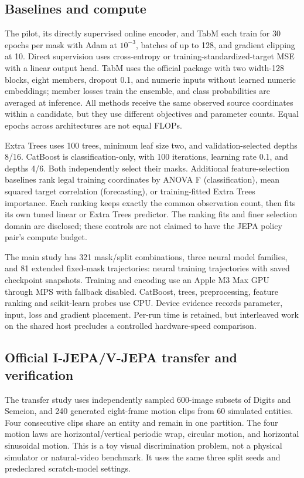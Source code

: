 \documentclass{article}
\begin{document}
\subsection{Baselines and compute}
The pilot, its directly supervised online encoder, and TabM each train for 30 epochs per mask with Adam at $10^{-3}$, batches of up to 128, and gradient clipping at 10. Direct supervision uses cross-entropy or training-standardized-target MSE with a linear output head. TabM uses the official package with two width-128 blocks, eight members, dropout 0.1, and numeric inputs without learned numeric embeddings; member losses train the ensemble, and class probabilities are averaged at inference. All methods receive the same observed source coordinates within a candidate, but they use different objectives and parameter counts. Equal epochs across architectures are not equal FLOPs.

Extra Trees uses 100 trees, minimum leaf size two, and validation-selected depths 8/16. CatBoost is classification-only, with 100 iterations, learning rate 0.1, and depths 4/6. Both independently select their masks. Additional feature-selection baselines rank legal training coordinates by ANOVA F (classification), mean squared target correlation (forecasting), or training-fitted Extra Trees importance. Each ranking keeps exactly the common observation count, then fits its own tuned linear or Extra Trees predictor. The ranking fits and finer selection domain are disclosed; these controls are not claimed to have the JEPA policy pair's compute budget.

The main study has 321 mask/split combinations, three neural model families, and 81 extended fixed-mask trajectories: \ExtRuns{} neural training trajectories with \ExtCheckpoints{} saved checkpoint snapshots. Training and encoding use an Apple M3 Max GPU through MPS with fallback disabled. CatBoost, trees, preprocessing, feature ranking and scikit-learn probes \citep{pedregosa2011sklearn} use CPU. Device evidence records parameter, input, loss and gradient placement. Per-run time is retained, but interleaved work on the shared host precludes a controlled hardware-speed comparison.

\subsection{Official I-JEPA/V-JEPA transfer and verification}
The transfer study uses independently sampled 600-image subsets of Digits and Semeion, and 240 generated eight-frame motion clips from 60 simulated entities. Four consecutive clips share an entity and remain in one partition. The four motion laws are horizontal/vertical periodic wrap, circular motion, and horizontal sinusoidal motion. This is a toy visual discrimination problem, not a physical simulator or natural-video benchmark. It uses the same three split seeds and predeclared scratch-model settings.
\end{document}

